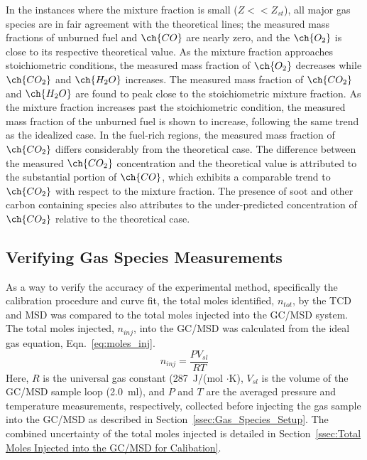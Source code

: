 \documentclass[12pt]{article}
\begin{document}
In the instances where the mixture fraction is small ($Z<<Z_{st}$), all major gas species are in fair agreement with the theoretical lines; the measured mass fractions of unburned fuel and $\ch{CO}$ are nearly zero, and the $\ch{O_2}$ is close to its respective theoretical value. As the mixture fraction approaches stoichiometric conditions, the measured mass fraction of $\ch{O_{2}}$ decreases while $\ch{CO_{2}}$ and $\ch{H_{2}O}$ increases. The measured mass fraction of $\ch{CO_{2}}$ and $\ch{H_{2}O}$ are found to peak close to the stoichiometric mixture fraction. As the mixture fraction increases past the stoichiometric condition, the measured mass fraction of the unburned fuel is shown to increase, following the same trend as the idealized case. In the fuel-rich regions, the measured mass fraction of $\ch{CO_{2}}$ differs considerably from the theoretical case. The difference between the measured $\ch{CO_{2}}$ concentration and the theoretical value is attributed to the substantial portion of $\ch{CO}$, which exhibits a comparable trend to $\ch{CO_{2}}$ with respect to the mixture fraction. The presence of soot and other carbon containing species also attributes to the under-predicted concentration of $\ch{CO_{2}}$ relative to the theoretical case. 

\subsection{Verifying Gas Species Measurements}
\label{ssec:Verifying_Vol_Frac_Measurements}
As a way to verify the accuracy of the experimental method, specifically the calibration procedure and curve fit, the total moles identified, $n_{tot}$, by the TCD and MSD was compared to the total moles injected into the GC/MSD system. The total moles injected, $n_{inj}$, into the GC/MSD was calculated from the ideal gas equation, Eqn.~\ref{eq:moles_inj}.
\begin{equation}\label{eq:moles_inj}
n_{inj}=\frac{PV_{sl}}{RT}
\end{equation} 
Here, $R$ is the universal gas constant (287~J/(mol $\cdot$K), $V_{sl}$ is the volume of the GC/MSD sample loop (\SI{2.0}{ml}), and $P$ and $T$ are the averaged pressure and temperature measurements, respectively, collected before injecting the gas sample into the GC/MSD as described in Section~\ref{ssec:Gas_Species_Setup}. The combined uncertainty of the total moles injected is detailed in Section~\ref{ssec:Total Moles Injected into the GC/MSD for Calibation}.
\end{document}
